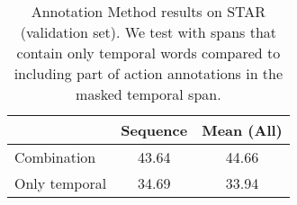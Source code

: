 \begin{table}[t]
	\centering
	\caption{Annotation Method results on STAR (validation set). We test with
	spans that contain only temporal words compared to including part of action
	annotations in the masked temporal span.}
	\label{tab:annot_method}
	\begin{tabular}{lcc}
		\toprule
		 & Sequence & Mean (All) \\
		\midrule
		Combination & 43.64 & 44.66 \\
		Only temporal & 34.69 & 33.94 \\
		\bottomrule
	\end{tabular}
\end{table}


%
%
%

%


